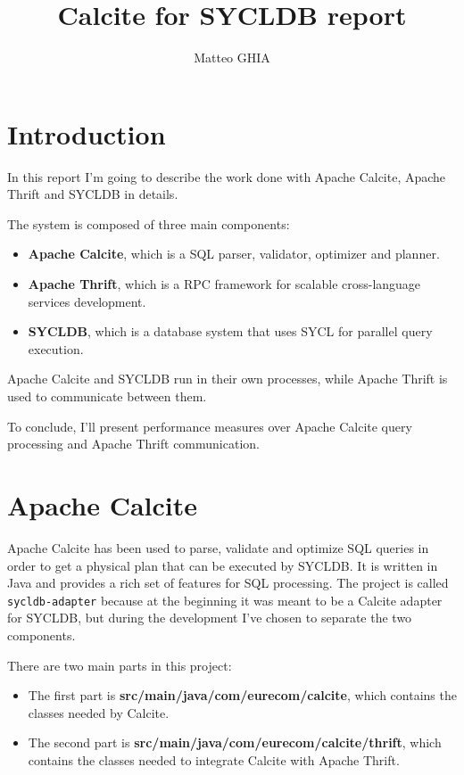 \documentclass[a4paper, 10pt]{article}
\title{Calcite for SYCLDB report}
\author{Matteo GHIA}
\begin{document}
\maketitle

\section{Introduction}

In this report I'm going to describe the work done with Apache Calcite, Apache Thrift and SYCLDB in details.

The system is composed of three main components:
\begin{itemize}
    \item \textbf{Apache Calcite}, which is a SQL parser, validator, optimizer and planner.
    \item \textbf{Apache Thrift}, which is a RPC framework for scalable cross-language services development.
    \item \textbf{SYCLDB}, which is a database system that uses SYCL for parallel query execution.
\end{itemize}
Apache Calcite and SYCLDB run in their own processes, while Apache Thrift is used to communicate between them.

To conclude, I'll present performance measures over Apache Calcite query processing and Apache Thrift communication.

\section{Apache Calcite}

Apache Calcite has been used to parse, validate and optimize SQL queries in order to get a physical plan that can be executed by SYCLDB. It is written in Java and provides a rich set of features for SQL processing. The project is called \texttt{sycldb-adapter} because at the beginning it was meant to be a Calcite adapter for SYCLDB, but during the development I've chosen to separate the two components.

There are two main parts in this project:
\begin{itemize}
    \item The first part is \textbf{src/main/java/com/eurecom/calcite}, which contains the classes needed by Calcite.
    \item The second part is \textbf{src/main/java/com/eurecom/calcite/thrift}, which contains the classes needed to integrate Calcite with Apache Thrift.
\end{itemize}
\end{document}
